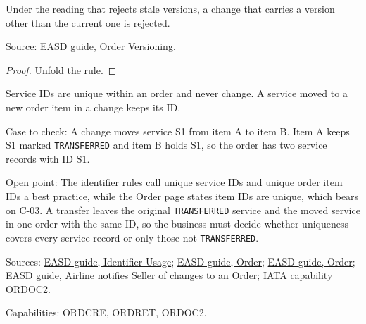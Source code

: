 \begin{theorem}
  \label{thm:order-creation-stale-rejected-of-reject}
  Under the reading that rejects stale versions, a change that carries a
  version other than the current one is rejected.

  Source: \href{https://standards.atlassian.net/wiki/spaces/EASD/pages/574259659/Order+Versioning}{EASD guide, Order Versioning}.
\end{theorem}
\begin{proof}
  Unfold the rule.
\end{proof}

\begin{theorem}
  \label{thm:order-creation-service-id-unique}
  \notready
  Service IDs are unique within an order and never change. A service moved
  to a new order item in a change keeps its ID.

  Case to check: A change moves service S1 from item A to item B. Item A
  keeps S1 marked \texttt{TRANSFERRED} and item B holds S1, so the order has
  two service records with ID S1.

  Open point: The identifier rules call unique service IDs and unique order
  item IDs a best practice, while the Order page states item IDs are unique,
  which bears on C-03. A transfer leaves the original \texttt{TRANSFERRED}
  service and the moved service in one order with the same ID, so the
  business must decide whether uniqueness covers every service record or
  only those not \texttt{TRANSFERRED}.

  Sources: \href{https://standards.atlassian.net/wiki/spaces/EASD/pages/574226512/Identifier+Usage}{EASD guide, Identifier Usage};
  \href{https://standards.atlassian.net/wiki/spaces/EASD/pages/574849062/Order}{EASD guide, Order};
  \href{https://standards.atlassian.net/wiki/spaces/EASD/pages/574849062}{EASD guide, Order};
  \href{https://standards.atlassian.net/wiki/spaces/EASD/pages/815202352}{EASD guide, Airline notifies Seller of changes to an Order};
  \href{https://retailing.iata.org/armi/docs/ORDOC2/}{IATA capability ORDOC2}.

  Capabilities: ORDCRE, ORDRET, ORDOC2.
\end{theorem}

